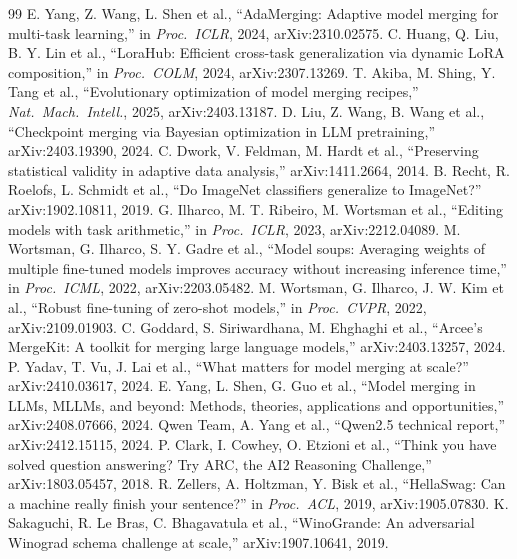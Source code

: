 \documentclass[conference]{IEEEtran}
\begin{document}
\begin{thebibliography}{99}
 E. Yang, Z. Wang, L. Shen et al., ``AdaMerging: Adaptive model merging for multi-task learning,'' in \emph{Proc.\ ICLR}, 2024, arXiv:2310.02575.
 C. Huang, Q. Liu, B. Y. Lin et al., ``LoraHub: Efficient cross-task generalization via dynamic LoRA composition,'' in \emph{Proc.\ COLM}, 2024, arXiv:2307.13269.
 T. Akiba, M. Shing, Y. Tang et al., ``Evolutionary optimization of model merging recipes,'' \emph{Nat.\ Mach.\ Intell.}, 2025, arXiv:2403.13187.
 D. Liu, Z. Wang, B. Wang et al., ``Checkpoint merging via Bayesian optimization in LLM pretraining,'' arXiv:2403.19390, 2024.
 C. Dwork, V. Feldman, M. Hardt et al., ``Preserving statistical validity in adaptive data analysis,'' arXiv:1411.2664, 2014.
 B. Recht, R. Roelofs, L. Schmidt et al., ``Do ImageNet classifiers generalize to ImageNet?'' arXiv:1902.10811, 2019.
 G. Ilharco, M. T. Ribeiro, M. Wortsman et al., ``Editing models with task arithmetic,'' in \emph{Proc.\ ICLR}, 2023, arXiv:2212.04089.
 M. Wortsman, G. Ilharco, S. Y. Gadre et al., ``Model soups: Averaging weights of multiple fine-tuned models improves accuracy without increasing inference time,'' in \emph{Proc.\ ICML}, 2022, arXiv:2203.05482.
 M. Wortsman, G. Ilharco, J. W. Kim et al., ``Robust fine-tuning of zero-shot models,'' in \emph{Proc.\ CVPR}, 2022, arXiv:2109.01903.
 C. Goddard, S. Siriwardhana, M. Ehghaghi et al., ``Arcee's MergeKit: A toolkit for merging large language models,'' arXiv:2403.13257, 2024.
 P. Yadav, T. Vu, J. Lai et al., ``What matters for model merging at scale?'' arXiv:2410.03617, 2024.
 E. Yang, L. Shen, G. Guo et al., ``Model merging in LLMs, MLLMs, and beyond: Methods, theories, applications and opportunities,'' arXiv:2408.07666, 2024.
 Qwen Team, A. Yang et al., ``Qwen2.5 technical report,'' arXiv:2412.15115, 2024.
 P. Clark, I. Cowhey, O. Etzioni et al., ``Think you have solved question answering? Try ARC, the AI2 Reasoning Challenge,'' arXiv:1803.05457, 2018.
 R. Zellers, A. Holtzman, Y. Bisk et al., ``HellaSwag: Can a machine really finish your sentence?'' in \emph{Proc.\ ACL}, 2019, arXiv:1905.07830.
 K. Sakaguchi, R. Le Bras, C. Bhagavatula et al., ``WinoGrande: An adversarial Winograd schema challenge at scale,'' arXiv:1907.10641, 2019.

\end{thebibliography}
\end{document}
